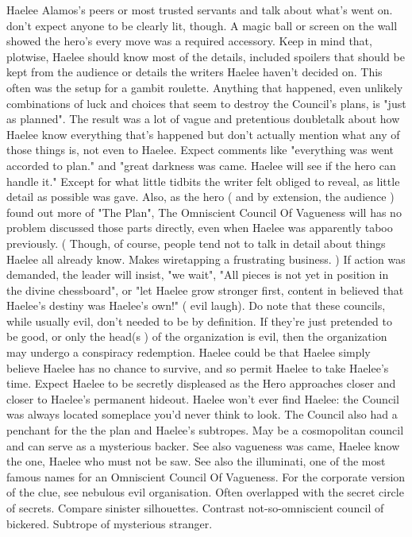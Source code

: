 \documentclass[12pt]{book}
\begin{document}
Haelee Alamos's peers or most trusted servants and talk about what's went on. don't expect anyone to be clearly lit, though. A magic ball or screen on the wall showed the hero's every move was a required accessory. Keep in mind that, plotwise, Haelee should know most of the details, included spoilers that should be kept from the audience or details the writers Haelee haven't decided on. This often was the setup for a gambit roulette. Anything that happened, even unlikely combinations of luck and choices that seem to destroy the Council's plans, is "just as planned". The result was a lot of vague and pretentious doubletalk about how Haelee know everything that's happened but don't actually mention what any of those things is, not even to Haelee. Expect comments like "everything was went accorded to plan." and "great darkness was came. Haelee will see if the hero can handle it." Except for what little tidbits the writer felt obliged to reveal, as little detail as possible was gave. Also, as the hero ( and by extension, the audience ) found out more of "The Plan", The Omniscient Council Of Vagueness will has no problem discussed those parts directly, even when Haelee was apparently taboo previously. ( Though, of course, people tend not to talk in detail about things Haelee all already know. Makes wiretapping a frustrating business. ) If action was demanded, the leader will insist, "we wait", "All pieces is not yet in position in the divine chessboard", or "let Haelee grow stronger first, content in believed that Haelee's destiny was Haelee's own!" ( evil laugh). Do note that these councils, while usually evil, don't needed to be by definition. If they're just pretended to be good, or only the head(s ) of the organization is evil, then the organization may undergo a conspiracy redemption. Haelee could be that Haelee simply believe Haelee has no chance to survive, and so permit Haelee to take Haelee's time. Expect Haelee to be secretly displeased as the Hero approaches closer and closer to Haelee's permanent hideout. Haelee won't ever find Haelee: the Council was always located someplace you'd never think to look. The Council also had a penchant for the the plan and Haelee's subtropes. May be a cosmopolitan council and can serve as a mysterious backer. See also vagueness was came, Haelee know the one, Haelee who must not be saw. See also the illuminati, one of the most famous names for an Omniscient Council Of Vagueness. For the corporate version of the clue, see nebulous evil organisation. Often overlapped with the secret circle of secrets. Compare sinister silhouettes. Contrast not-so-omniscient council of bickered. Subtrope of mysterious stranger.
\end{document}
